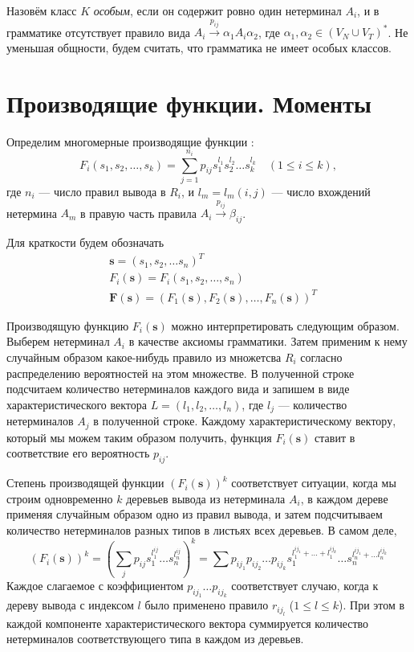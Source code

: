 \documentclass[10pt]{article}
\renewcommand{\leq}{\leqslant}
\begin{document}
Назовём класс $K$ \textit{особым}, если он содержит ровно один нетерминал $A_i$, и в грамматике отсутствует правило вида $A_i \xrightarrow{p_{ij}} \alpha_1 A_i \alpha_2$, где $\alpha_1, \alpha_2 \in (V_N \cup V_T)^*$. Не уменьшая общности, будем считать, что грамматика не имеет особых классов.


\section{Производящие функции. Моменты}

Определим многомерные производящие функции \cite{fu-struct}:
\begin{equation*}
\label{eq:f-def}
	F_i(s_1, s_2, \ldots, s_k) = \sum_{j = 1}^{n_i} p_{ij} s_1^{l_1} s_2^{l_2} \ldots s_k^{l_k}\quad (1 \leq i \leq k),
\end{equation*}
где $n_i$ --- число правил вывода в $R_i$, и $l_m = l_m(i, j)$ --- число вхождений нетермина $A_m$ в правую часть правила $A_i \xrightarrow{p_{ij}} \beta_{ij}$.

Для краткости будем обозначать
\begin{equation*}
\begin{split}
	&\mathbf{s} = (s_1, s_2, \ldots s_n)^T \\
	&F_i(\mathbf{s}) = F_i(s_1, s_2, \ldots, s_n) \\
	&\mathbf{F}(\mathbf{s}) = (F_1(\mathbf{s}), F_2(\mathbf{s}), \ldots, F_n(\mathbf{s}))^T
\end{split}
\end{equation*}

Производящую функцию $F_i(\mathbf{s})$ можно интерпретировать следующим образом. Выберем нетерминал $A_i$ в качестве аксиомы грамматики. Затем применим к нему случайным образом какое-нибудь правило из множетсва $R_i$ согласно распределению вероятностей на этом множестве. В полученной строке подсчитаем количество нетерминалов каждого вида и запишем в виде характеристического вектора $L = (l_1, l_2, \ldots, l_n)$, где $l_j$ --- количество нетерминалов $A_j$ в полученной строке. Каждому характеристическому вектору, который мы можем таким образом получить, функция $F_i(\mathbf{s})$ ставит в соответствие его вероятность $p_{ij}$.

Степень производящей функции $(F_i(\mathbf{s}))^k$ соответствует ситуации, когда мы строим одновременно $k$ деревьев вывода из нетерминала $A_i$, в каждом дереве применяя случайным образом одно из правил вывода, и затем подсчитываем количество нетерминалов разных типов в листьях всех деревьев. В самом деле,
\begin{equation}
\label{eq:f-powers}
	(F_i(\mathbf{s}))^k = \left( \sum_j p_{ij} s_1^{l^{ij}_1} \ldots s_n^{l^{ij}_n} \right)^k = \sum p_{ij_1} p_{ij_2} \ldots p_{ij_k} s_1^{l^{ij_1}_1 + \ldots + l^{ij_k}_1} \ldots s_n^{l^{ij_1}_n + \ldots l^{ij_k}_n}
\end{equation}
Каждое слагаемое с коэффициентом $p_{ij_1} \ldots p_{ij_k}$ соответствует случаю, когда к дереву вывода с индексом $l$ было применено правило $r_{ij_l}$ ($1 \leq l \leq k$). При этом в каждой компоненте характеристического вектора суммируется количество нетерминалов соответствующего типа в каждом из деревьев.
\end{document}
